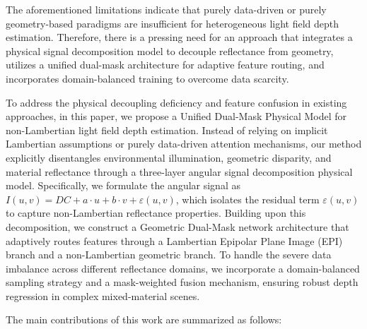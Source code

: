 \documentclass[lettersize,journal]{IEEEtran}
\begin{document}
The aforementioned limitations indicate that purely data-driven or purely geometry-based paradigms are insufficient for heterogeneous light field depth estimation. Therefore, there is a pressing need for an approach that integrates a physical signal decomposition model to decouple reflectance from geometry, utilizes a unified dual-mask architecture for adaptive feature routing, and incorporates domain-balanced training to overcome data scarcity.

To address the physical decoupling deficiency and feature confusion in existing approaches, in this paper, we propose a Unified Dual-Mask Physical Model for non-Lambertian light field depth estimation. Instead of relying on implicit Lambertian assumptions or purely data-driven attention mechanisms, our method explicitly disentangles environmental illumination, geometric disparity, and material reflectance through a three-layer angular signal decomposition physical model. Specifically, we formulate the angular signal as $I(u,v) = DC + a\cdot u + b\cdot v + \varepsilon(u,v)$, which isolates the residual term $\varepsilon(u,v)$ to capture non-Lambertian reflectance properties. Building upon this decomposition, we construct a Geometric Dual-Mask network architecture that adaptively routes features through a Lambertian Epipolar Plane Image (EPI) branch and a non-Lambertian geometric branch. To handle the severe data imbalance across different reflectance domains, we incorporate a domain-balanced sampling strategy and a mask-weighted fusion mechanism, ensuring robust depth regression in complex mixed-material scenes.

The main contributions of this work are summarized as follows:
\end{document}
